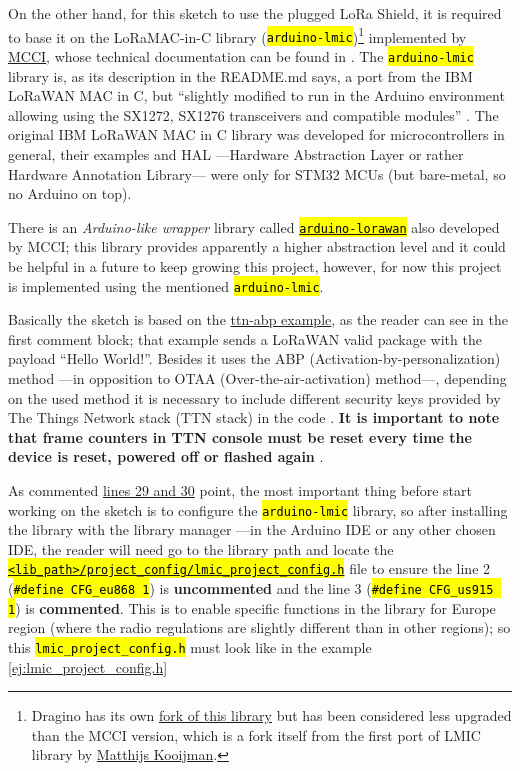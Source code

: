 \documentclass[11pt,a4paper,dvipsnames,twoside]{article}
\newcommand{\cmd}[1] {\hl{\texttt{#1}}}
\begin{document}
On the other hand, for this sketch to use the plugged LoRa Shield, it is required to base it on the LoRaMAC-in-C library \cite{MCCI_lmic} (\cmd{arduino-lmic})\footnote{Dragino has its own \href{https://github.com/dragino/arduino-lmic}{fork of this library} but has been considered less upgraded than the MCCI version, which is a fork itself from the first port of LMIC library by \href{https://github.com/matthijskooijman}{Matthijs Kooijman}.} implemented by \href{https://mcci.com/}{MCCI}, whose technical documentation can be found in \cite{MCCI_lmic_docs}. The \cmd{arduino-lmic} library is, as its description in the README.md says, a port from the IBM LoRaWAN MAC in C, but \enquote{slightly modified to run in the Arduino environment allowing using the SX1272, SX1276 transceivers and compatible modules} \cite{MCCI_lmic}. The original IBM LoRaWAN MAC in C library was developed for microcontrollers in general, their examples and HAL ---Hardware Abstraction Layer or rather Hardware Annotation Library--- were only for STM32 MCUs (but bare-metal, so no Arduino on top). 

There is an \textit{Arduino-like wrapper} library called \href{https://github.com/mcci-catena/arduino-lorawan}{\cmd{arduino-lorawan}} also developed by MCCI; this library provides apparently a higher abstraction level and it could be helpful in a future to keep growing this project, however, for now this project is implemented using the mentioned \cmd{arduino-lmic}.

Basically the sketch is based on the \href{https://github.com/mcci-catena/arduino-lmic/blob/master/examples/ttn-abp/ttn-abp.ino}{ttn-abp example}, as the reader can see in the first comment block; that example sends a LoRaWAN valid package with the payload \enquote{Hello World!}. Besides it uses the ABP (Activation-by-personalization) method ---in opposition to OTAA (Over-the-air-activation) method---, depending on the used method it is necessary to include different security keys provided by The Things Network stack (TTN stack) in the code \cite{TTN_Security}. \textbf{It is important to note that frame counters in TTN console must be reset every time the device is reset, powered off or flashed again} \cite{TTN_frame_counters}.

As commented \href{https://github.com/mcci-catena/arduino-lmic/blob/master/examples/ttn-abp/ttn-abp.ino#L29}{lines 29 and 30} point, the most important thing before start working on the sketch is to configure the \cmd{arduino-lmic} library, so after installing the library with the library manager ---in the Arduino IDE or any other chosen IDE, the reader will need go to the library path and locate the \href{https://github.com/mcci-catena/arduino-lmic/blob/master/project_config/lmic_project_config.h}{\cmd{<lib\_path>/project\_config/lmic\_project\_config.h}} file to ensure the line 2 (\cmd{\#define CFG\_eu868 1}) is \textbf{uncommented} and the line 3 (\cmd{\#define CFG\_us915 1}) is \textbf{commented}. This is to enable specific functions in the library for Europe region (where the radio regulations are slightly different than in other regions); so this \cmd{lmic\_project\_config.h} must look like in the example \ref{ej:lmic_project_config.h}
\end{document}
